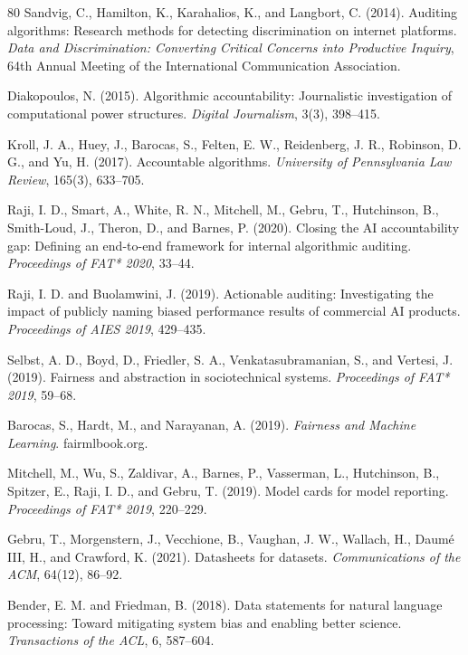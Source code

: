 \documentclass[11pt,a4paper]{article}
\begin{document}
\begin{thebibliography}{80}
Sandvig, C., Hamilton, K., Karahalios, K., and Langbort, C. (2014). Auditing algorithms: Research methods for detecting discrimination on internet platforms. \textit{Data and Discrimination: Converting Critical Concerns into Productive Inquiry}, 64th Annual Meeting of the International Communication Association.

Diakopoulos, N. (2015). Algorithmic accountability: Journalistic investigation of computational power structures. \textit{Digital Journalism}, 3(3), 398--415.

Kroll, J. A., Huey, J., Barocas, S., Felten, E. W., Reidenberg, J. R., Robinson, D. G., and Yu, H. (2017). Accountable algorithms. \textit{University of Pennsylvania Law Review}, 165(3), 633--705.

Raji, I. D., Smart, A., White, R. N., Mitchell, M., Gebru, T., Hutchinson, B., Smith-Loud, J., Theron, D., and Barnes, P. (2020). Closing the AI accountability gap: Defining an end-to-end framework for internal algorithmic auditing. \textit{Proceedings of FAT* 2020}, 33--44.

Raji, I. D. and Buolamwini, J. (2019). Actionable auditing: Investigating the impact of publicly naming biased performance results of commercial AI products. \textit{Proceedings of AIES 2019}, 429--435.

Selbst, A. D., Boyd, D., Friedler, S. A., Venkatasubramanian, S., and Vertesi, J. (2019). Fairness and abstraction in sociotechnical systems. \textit{Proceedings of FAT* 2019}, 59--68.

Barocas, S., Hardt, M., and Narayanan, A. (2019). \textit{Fairness and Machine Learning}. fairmlbook.org.

Mitchell, M., Wu, S., Zaldivar, A., Barnes, P., Vasserman, L., Hutchinson, B., Spitzer, E., Raji, I. D., and Gebru, T. (2019). Model cards for model reporting. \textit{Proceedings of FAT* 2019}, 220--229.

Gebru, T., Morgenstern, J., Vecchione, B., Vaughan, J. W., Wallach, H., Daum\'e III, H., and Crawford, K. (2021). Datasheets for datasets. \textit{Communications of the ACM}, 64(12), 86--92.

Bender, E. M. and Friedman, B. (2018). Data statements for natural language processing: Toward mitigating system bias and enabling better science. \textit{Transactions of the ACL}, 6, 587--604.


\end{thebibliography}
\end{document}
